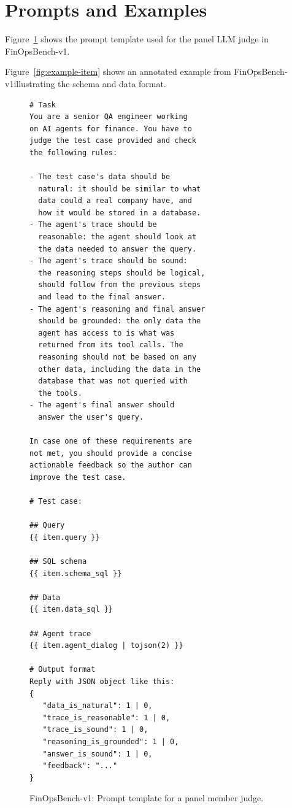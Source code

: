 \documentclass[11pt]{article}
\newcommand{\synthsubset}{FinOpsBench-v1}\xspace
\begin{document}
\section{Prompts and Examples}
\label{app:prompts}

Figure~\ref{fig:judge-prompt} shows the prompt template used for the 
panel
LLM judge in \synthsubset.

Figure~\ref{fig:example-item} shows an annotated example from \synthsubset illustrating the schema and data format.

\begin{figure}[t]
\small\centering
\begin{verbatim}
# Task
You are a senior QA engineer working
on AI agents for finance. You have to 
judge the test case provided and check 
the following rules:

- The test case's data should be 
  natural: it should be similar to what 
  data could a real company have, and 
  how it would be stored in a database.
- The agent's trace should be 
  reasonable: the agent should look at 
  the data needed to answer the query.
- The agent's trace should be sound: 
  the reasoning steps should be logical, 
  should follow from the previous steps 
  and lead to the final answer.
- The agent's reasoning and final answer 
  should be grounded: the only data the 
  agent has access to is what was 
  returned from its tool calls. The 
  reasoning should not be based on any 
  other data, including the data in the 
  database that was not queried with 
  the tools.
- The agent's final answer should 
  answer the user's query.

In case one of these requirements are 
not met, you should provide a concise
actionable feedback so the author can 
improve the test case.

# Test case:

## Query
{{ item.query }}

## SQL schema
{{ item.schema_sql }}

## Data
{{ item.data_sql }}

## Agent trace
{{ item.agent_dialog | tojson(2) }}

# Output format
Reply with JSON object like this:
{
   "data_is_natural": 1 | 0,
   "trace_is_reasonable": 1 | 0,
   "trace_is_sound": 1 | 0,
   "reasoning_is_grounded": 1 | 0,
   "answer_is_sound": 1 | 0,
   "feedback": "..."
}
\end{verbatim}
\caption{\synthsubset: Prompt template for a 
panel
member judge.}
\label{fig:judge-prompt}
\end{figure}
\end{document}
